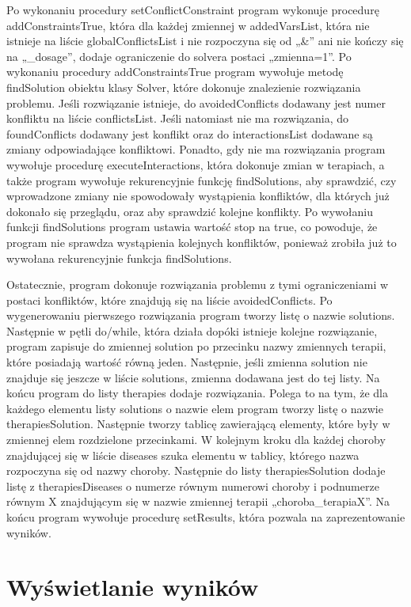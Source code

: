 Po wykonaniu procedury setConflictConstraint program wykonuje procedurę addConstraintsTrue, która dla każdej zmiennej w addedVarsList, która nie istnieje na liście globalConflictsList i nie rozpoczyna się od „\&” ani nie kończy się na „\_dosage”, dodaje ograniczenie do solvera postaci „zmienna=1”. Po wykonaniu procedury addConstraintsTrue program wywołuje metodę findSolution obiektu klasy Solver, które dokonuje znalezienie rozwiązania problemu. Jeśli rozwiązanie istnieje, do avoidedConflicts dodawany jest numer konfliktu na liście conflictsList. Jeśli natomiast nie ma rozwiązania, do foundConflicts dodawany jest konflikt oraz do interactionsList dodawane są zmiany odpowiadające konfliktowi. Ponadto, gdy nie ma rozwiązania program wywołuje procedurę executeInteractions, która dokonuje zmian w terapiach, a także program wywołuje rekurencyjnie funkcję findSolutions, aby sprawdzić, czy wprowadzone zmiany nie spowodowały wystąpienia konfliktów, dla których już dokonało się przeglądu, oraz aby sprawdzić kolejne konflikty. Po wywołaniu funkcji findSolutions program ustawia wartość stop na true, co powoduje, że program nie sprawdza wystąpienia kolejnych konfliktów, ponieważ zrobiła już to wywołana rekurencyjnie funkcja findSolutions. 

Ostatecznie, program dokonuje rozwiązania problemu z tymi ograniczeniami w postaci konfliktów, które znajdują się na liście avoidedConflicts. Po wygenerowaniu pierwszego rozwiązania program tworzy listę o nazwie solutions. Następnie w pętli do/while, która działa dopóki istnieje kolejne rozwiązanie, program zapisuje do zmiennej solution po przecinku nazwy zmiennych terapii, które posiadają wartość równą jeden. Następnie, jeśli zmienna solution nie znajduje się jeszcze w liście solutions, zmienna dodawana jest do tej listy. Na końcu program do listy therapies dodaje rozwiązania. Polega to na tym, że dla każdego elementu listy solutions o nazwie elem program tworzy listę o nazwie therapiesSolution. Następnie tworzy tablicę zawierającą elementy, które były w zmiennej elem rozdzielone przecinkami. W kolejnym kroku dla każdej choroby znajdującej się w liście diseases szuka elementu w tablicy, którego nazwa rozpoczyna się od nazwy choroby. Następnie do listy therapiesSolution dodaje listę z therapiesDiseases o numerze równym numerowi choroby i podnumerze równym X znajdującym się w nazwie zmiennej terapii „choroba\_terapiaX”. Na końcu program wywołuje procedurę setResults, która pozwala na zaprezentowanie wyników. 

\section{Wyświetlanie wyników}


